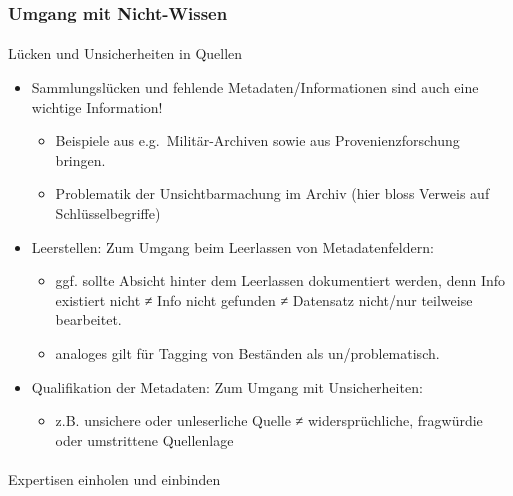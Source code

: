 \documentclass[
  letterpaper,
  DIV=11,
  numbers=noendperiod]{scrartcl}
\makeatletter
\let\oldparagraph\paragraph
\renewcommand{\paragraph}{
    \@ifstar
      \xxxParagraphStar
      \xxxParagraphNoStar
  }
\newcommand{\xxxParagraphStar}[1]{\oldparagraph*{#1}\mbox{}}
\newcommand{\xxxParagraphNoStar}[1]{\oldparagraph{#1}\mbox{}}
\providecommand{\tightlist}{%
  \setlength{\itemsep}{0pt}\setlength{\parskip}{0pt}}\usepackage{longtable,booktabs,array}
\makeatother
\begin{document}
\subsubsection{Umgang mit Nicht-Wissen}\label{umgang-mit-nicht-wissen}

\paragraph{Lücken und Unsicherheiten in
Quellen}\label{luxfccken-und-unsicherheiten-in-quellen}

\begin{itemize}
\tightlist
\item
  Sammlungslücken und fehlende Metadaten/Informationen sind auch eine
  wichtige Information!

  \begin{itemize}
  \tightlist
  \item
    Beispiele aus e.g.~Militär-Archiven sowie aus Provenienzforschung
    bringen.
  \item
    Problematik der Unsichtbarmachung im Archiv (hier bloss Verweis auf
    Schlüsselbegriffe)
  \end{itemize}
\item
  Leerstellen: Zum Umgang beim Leerlassen von Metadatenfeldern:

  \begin{itemize}
  \tightlist
  \item
    ggf. sollte Absicht hinter dem Leerlassen dokumentiert werden, denn
    Info existiert nicht ≠ Info nicht gefunden ≠ Datensatz nicht/nur
    teilweise bearbeitet.
  \item
    analoges gilt für Tagging von Beständen als un/problematisch.
  \end{itemize}
\item
  Qualifikation der Metadaten: Zum Umgang mit Unsicherheiten:

  \begin{itemize}
  \tightlist
  \item
    z.B. unsichere oder unleserliche Quelle ≠ widersprüchliche,
    fragwürdie oder umstrittene Quellenlage
  \end{itemize}
\end{itemize}

\paragraph{Expertisen einholen und
einbinden}\label{expertisen-einholen-und-einbinden}
\end{document}
